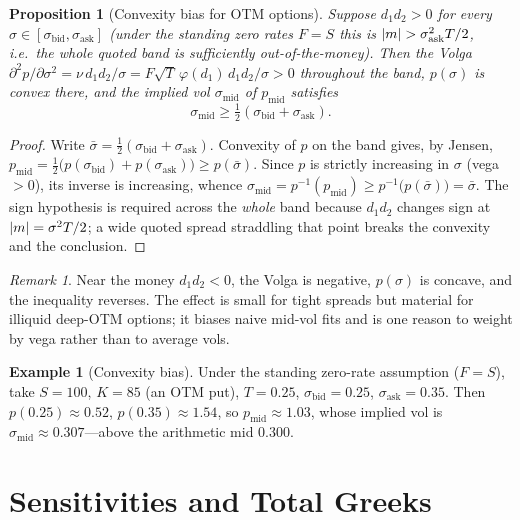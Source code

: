 \documentclass[11pt]{book}
\theoremstyle{plain}
\newtheorem{proposition}[theorem]{Proposition}
\theoremstyle{definition}
\newtheorem{example}[theorem]{Example}
\theoremstyle{remark}
\newtheorem{remark}[theorem]{Remark}
\newcommand{\mln}{m}                             %
\newcommand{\npdf}{\varphi}                      %
\newcommand{\vega}{\nu}                          %
\DeclarePairedDelimiter{\abs}{\lvert}{\rvert}
\begin{document}
\begin{proposition}[Convexity bias for OTM options]\label{prop:convexity}
Suppose $d_1 d_2 > 0$ for \emph{every} $\sigma\in[\sigma_{\mathrm{bid}},
\sigma_{\mathrm{ask}}]$ (under the standing zero rates $F=S$ this is
$\abs{\mln} > \sigma_{\mathrm{ask}}^2 T/2$, i.e.\ the whole quoted band is
sufficiently out-of-the-money). Then the Volga
$\partial^2 p/\partial\sigma^2 = \vega\,d_1 d_2/\sigma
= F\sqrt{T}\,\npdf(d_1)\,d_1 d_2/\sigma > 0$ throughout the band,
$p(\sigma)$ is convex there, and the implied vol $\sigma_{\mathrm{mid}}$ of
$p_{\mathrm{mid}}$ satisfies
\[
\sigma_{\mathrm{mid}} \ge \tfrac12(\sigma_{\mathrm{bid}} + \sigma_{\mathrm{ask}}).
\]
\end{proposition}
\begin{proof}
Write $\bar\sigma = \tfrac12(\sigma_{\mathrm{bid}}+\sigma_{\mathrm{ask}})$.
Convexity of $p$ on the band gives, by Jensen,
$p_{\mathrm{mid}} = \tfrac12\bigl(p(\sigma_{\mathrm{bid}})+p(\sigma_{\mathrm{ask}})\bigr)
\ge p(\bar\sigma)$. Since $p$ is strictly increasing in $\sigma$ (vega $>0$), its
inverse is increasing, whence
$\sigma_{\mathrm{mid}} = p^{-1}(p_{\mathrm{mid}}) \ge p^{-1}\!\bigl(p(\bar\sigma)\bigr)
= \bar\sigma$. The sign hypothesis is required across the \emph{whole} band
because $d_1 d_2$ changes sign at $\abs{\mln}=\sigma^2 T/2$; a wide quoted
spread straddling that point breaks the convexity and the conclusion.
\end{proof}

\begin{remark}\label{rem:convexity-atm}
Near the money $d_1 d_2 < 0$, the Volga is negative, $p(\sigma)$ is concave, and
the inequality reverses. The effect is small for tight spreads but material for
illiquid deep-OTM options; it biases naive mid-vol fits and is one reason to
weight by vega rather than to average vols.
\end{remark}

\begin{example}[Convexity bias]\label{ex:convexity}
Under the standing zero-rate assumption ($F = S$), take $S = 100$, $K = 85$
(an OTM put), $T = 0.25$, $\sigma_{\mathrm{bid}} = 0.25$,
$\sigma_{\mathrm{ask}} = 0.35$. Then $p(0.25) \approx 0.52$,
$p(0.35) \approx 1.54$, so $p_{\mathrm{mid}} \approx 1.03$, whose implied vol is
$\sigma_{\mathrm{mid}} \approx 0.307$---above the arithmetic mid $0.300$.
\end{example}

\section{Sensitivities and Total Greeks}
\label{sec:sensitivity}
\end{document}

